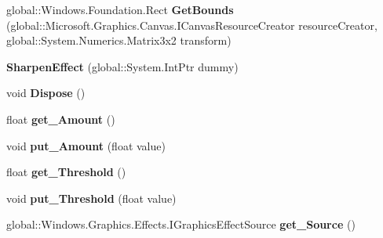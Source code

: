 \begin{DoxyCompactItemize}
global\+::\+Windows.\+Foundation.\+Rect {\bfseries Get\+Bounds} (global\+::\+Microsoft.\+Graphics.\+Canvas.\+I\+Canvas\+Resource\+Creator resource\+Creator, global\+::\+System.\+Numerics.\+Matrix3x2 transform)
\item 
\mbox{\label{class_microsoft_1_1_graphics_1_1_canvas_1_1_effects_1_1_sharpen_effect_aa2c447cd17b2262cd288cbd0ecd66538}} 
{\bfseries Sharpen\+Effect} (global\+::\+System.\+Int\+Ptr dummy)
\item 
\mbox{\label{class_microsoft_1_1_graphics_1_1_canvas_1_1_effects_1_1_sharpen_effect_ab80afd02393c881baccb9ee076f0e68a}} 
void {\bfseries Dispose} ()
\item 
\mbox{\label{class_microsoft_1_1_graphics_1_1_canvas_1_1_effects_1_1_sharpen_effect_aa474bc9966d9aebafd4d25b60af032b6}} 
float {\bfseries get\+\_\+\+Amount} ()
\item 
\mbox{\label{class_microsoft_1_1_graphics_1_1_canvas_1_1_effects_1_1_sharpen_effect_aeee519576168a556c0566065630c0937}} 
void {\bfseries put\+\_\+\+Amount} (float value)
\item 
\mbox{\label{class_microsoft_1_1_graphics_1_1_canvas_1_1_effects_1_1_sharpen_effect_a0320c466d500b7944352011eb677edc0}} 
float {\bfseries get\+\_\+\+Threshold} ()
\item 
\mbox{\label{class_microsoft_1_1_graphics_1_1_canvas_1_1_effects_1_1_sharpen_effect_a5f9d61f44f74075ed5a77d67e501fc4f}} 
void {\bfseries put\+\_\+\+Threshold} (float value)
\item 
\mbox{\label{class_microsoft_1_1_graphics_1_1_canvas_1_1_effects_1_1_sharpen_effect_a7bcfebcb9e3ceafcbf99dfeb3b9de323}} 
global\+::\+Windows.\+Graphics.\+Effects.\+I\+Graphics\+Effect\+Source {\bfseries get\+\_\+\+Source} ()
\item 

\end{DoxyCompactItemize}
